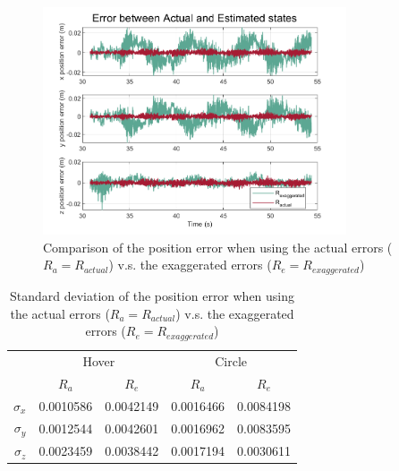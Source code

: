 \documentclass[letterpaper, paper,11pt]{AAS}	%
\begin{document}
\begin{figure}[H]
	\centering\includegraphics[width=0.8\textwidth]{Figures/_BAK_err}
	\caption{Comparison of the position error when using the actual errors ($R_a=R_{actual}$) v.s. the exaggerated errors ($R_{e}=R_{exaggerated}$)}
	\label{fig:NewSigma}
\end{figure}

\begin{table}[H]
\centering
\caption{Standard deviation of the position error when using the actual errors ($R_a=R_{actual}$) v.s. the exaggerated errors ($R_{e}=R_{exaggerated}$)}
\label{tab:NewSigma}
\begin{tabular}{|r|ll|ll|}
\hline
\multirow{2}{*}{\ } & \multicolumn{2}{c|}{Hover} & \multicolumn{2}{c|}{Circle} \\ \cline{2-5} 
 & \multicolumn{1}{c|}{$R_{a}$} & \multicolumn{1}{c|}{$R_{e}$} & \multicolumn{1}{c|}{$R_{a}$} & \multicolumn{1}{c|}{$R_{e}$} \\ \hline
$\sigma_x$ & \multicolumn{1}{l|}{0.0010586} & 0.0042149 & \multicolumn{1}{l|}{0.0016466} & 0.0084198 \\ \hline
$\sigma_y$ & \multicolumn{1}{l|}{0.0012544} & 0.0042601 & \multicolumn{1}{l|}{0.0016962} & 0.0083595 \\ \hline
$\sigma_z$ & \multicolumn{1}{l|}{0.0023459} & 0.0038442 & \multicolumn{1}{l|}{0.0017194} & 0.0030611 \\ \hline
\end{tabular}
\end{table}
\end{document}
